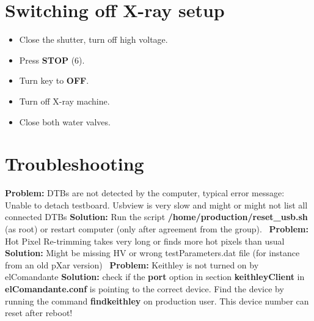 \documentclass[fleqn,10pt]{SelfArx} %
\newcommand{\prob}[1]{{\textbf{Problem: } #1}\newline}
\newcommand{\sol}[1]{{\textbf{Solution: } #1 \newline \,\newline}}
\begin{document}
\section{Switching off X-ray setup}
\begin{itemize}
\item {Close the shutter, turn off high voltage.}
\item {Press \textbf{STOP} (6).}
\item {Turn key to \textbf{OFF}.}
\item {Turn off X-ray machine.}
\item {Close both water valves.}
\end{itemize}

\section{Troubleshooting}

\prob{DTBs are not detected by the computer, typical error message: Unable to detach testboard. Usbview is very slow and might or might not list all connected DTBs}
\sol{Run the script \textbf{/home/production/reset\_usb.sh} (as root) or restart computer (only after agreement from the group).}
\prob{Hot Pixel Re-trimming takes very long or finds more hot pixels than usual}
\sol{Might be missing HV or wrong testParameters.dat file (for instance from an old pXar version)}
\prob{Keithley is not turned on by elComandante}
\sol{check if the \textbf{port} option in section \textbf{keithleyClient} in \textbf{elComandante.conf} is pointing to the correct device. Find the device by running the command \mbox{\textbf{findkeithley}} on production user. This device number can reset after reboot!}












\end{document}
